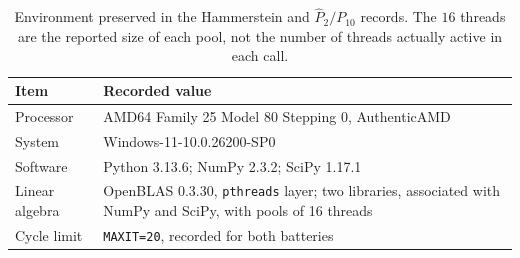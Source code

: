 \begin{table}[htbp]
\centering\small
\caption{Environment preserved in the Hammerstein and $\widehat P_2/P_{10}$ records. The $16$ threads are the reported size of each pool, not the number of threads actually active in each call.}\label{tab:recorded-environment}
\begin{tabularx}{\textwidth}{lX}
\toprule
Item & Recorded value\\\midrule
Processor & AMD64 Family 25 Model 80 Stepping 0, AuthenticAMD\\
System & Windows-11-10.0.26200-SP0\\
Software & Python 3.13.6; NumPy 2.3.2; SciPy 1.17.1\\
Linear algebra & OpenBLAS 0.3.30, \texttt{pthreads} layer; two libraries, associated with NumPy and SciPy, with pools of 16 threads\\
Cycle limit & \texttt{MAXIT=20}, recorded for both batteries\\
\bottomrule\end{tabularx}
\end{table}
